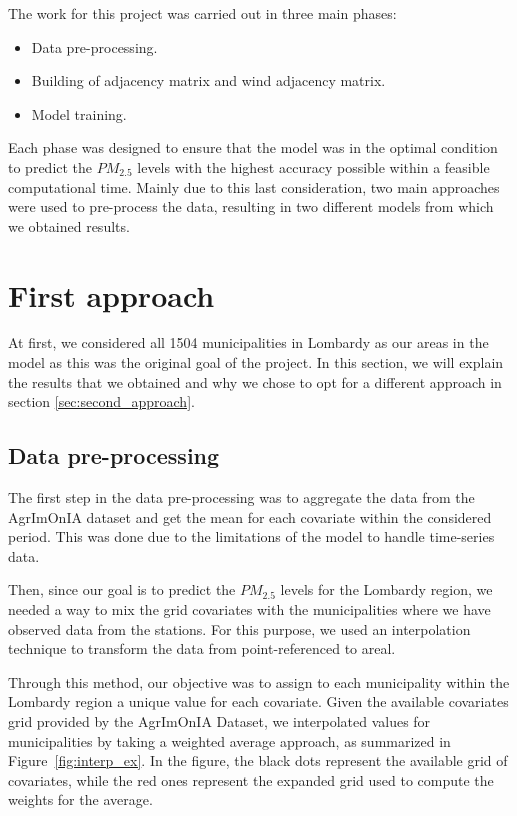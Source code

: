 \documentclass[11pt,a4paper]{article}
\begin{document}
The work for this project was carried out in three main phases:

\begin{itemize}
    \item Data pre-processing.
    \item Building of adjacency matrix and wind adjacency matrix.
    \item Model training.
\end{itemize}

Each phase was designed to ensure that the model was in the optimal condition to predict the $PM_{2.5}$ levels with the highest accuracy possible within a feasible computational time. Mainly due to this last consideration, two main approaches were used to pre-process the data, resulting in two different models from which we obtained results.

\section{First approach}
\label{sec:first_approach}
At first, we considered all 1504 municipalities in Lombardy as our areas in the model as this was the original goal of the project. In this section, we will explain the results that we obtained and why we chose to opt for a different approach in section \ref{sec:second_approach}.

\subsection{Data pre-processing}
\label{sec:data_preprocessing}

The first step in the data pre-processing was to aggregate the data from the AgrImOnIA dataset and get the mean for each covariate within the considered period. This was done due to the limitations of the model to handle time-series data.

Then, since our goal is to predict the $PM_{2.5}$ levels for the Lombardy region, we needed a way to mix the grid covariates with the municipalities where we have observed data from the stations. For this purpose, we used an interpolation technique to transform the data from point-referenced to areal.

Through this method, our objective was to assign to each municipality within the Lombardy region a unique value for each covariate. Given the available covariates grid provided by the AgrImOnIA Dataset, we interpolated values for municipalities by taking a weighted average approach, as summarized in Figure~\ref{fig:interp_ex}. In the figure, the black dots represent the available grid of covariates, while the red ones represent the expanded grid used to compute the weights for the average.
\end{document}
